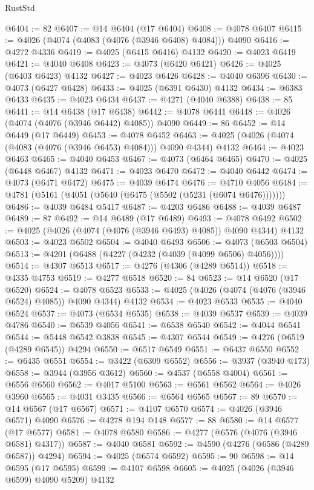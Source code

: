 \begin{lexlean}{RustStd}
\begin{coremodule}
@6404 := 82
@6407 := @14 @6404 (@17 @6404)
@6408 := @4078 @6407
@6415 := @4026 (@4074 (@4083 (@4076 (@3946 @6408) @4084))) @4090
@6416 := @4272 @4336
@6419 := @4025 (@6415 @6416) @4132
@6420 := @4023 @6419
@6421 := @4040 @6408
@6423 := @4073 (@6420 @6421)
@6426 := @4025 (@6403 @6423) @4132
@6427 := @4023 @6426
@6428 := @4040 @6396
@6430 := @4073 (@6427 @6428)
@6433 := @4025 (@6391 @6430) @4132
@6434 := @6383 @6433
@6435 := @4023 @6434
@6437 := @4271 (@4040 @6388)
@6438 := 85
@6441 := @14 @6438 (@17 @6438)
@6442 := @4078 @6441
@6448 := @4026 (@4074 (@4076 (@3946 @6442) @4085)) @4090
@6449 := 86
@6452 := @14 @6449 (@17 @6449)
@6453 := @4078 @6452
@6463 := @4025 (@4026 (@4074 (@4083 (@4076 (@3946 @6453) @4084))) @4090 @4344) @4132
@6464 := @4023 @6463
@6465 := @4040 @6453
@6467 := @4073 (@6464 @6465)
@6470 := @4025 (@6448 @6467) @4132
@6471 := @4023 @6470
@6472 := @4040 @6442
@6474 := @4073 (@6471 @6472)
@6475 := @4039 @6474
@6476 := @4710 @4056
@6484 := @4781 (@5161 (@4051 (@5640 (@6475 (@5502 (@5231 (@6074 @6476)))))))
@6486 := @4039 @6484 @5417
@6487 := @4203 @6486
@6488 := @4039 @6487
@6489 := 87
@6492 := @14 @6489 (@17 @6489)
@6493 := @4078 @6492
@6502 := @4025 (@4026 (@4074 (@4076 (@3946 @6493) @4085)) @4090 @4344) @4132
@6503 := @4023 @6502
@6504 := @4040 @6493
@6506 := @4073 (@6503 @6504)
@6513 := @4201 (@6488 (@4227 (@4232 (@4039 (@4099 @6506) @4056))))
@6514 := @4307 @6513
@6517 := @4276 (@4306 (@4289 @6514))
@6518 := @4335 @4753
@6519 := @4277 @6518
@6520 := 84
@6523 := @14 @6520 (@17 @6520)
@6524 := @4078 @6523
@6533 := @4025 (@4026 (@4074 (@4076 (@3946 @6524) @4085)) @4090 @4344) @4132
@6534 := @4023 @6533
@6535 := @4040 @6524
@6537 := @4073 (@6534 @6535)
@6538 := @4039 @6537
@6539 := @4039 @4786
@6540 := @6539 @4056
@6541 := @6538 @6540
@6542 := @4044 @6541
@6544 := @5448 @6542 @3838
@6545 := @4307 @6544
@6549 := @4276 (@6519 (@4289 @6545)) @4294
@6550 := @6517 @6549
@6551 := @6437 @6550
@6552 := @6435 @6551
@6554 := @3422 (@6309 @6552)
@6556 := @3937 (@3940 @173)
@6558 := @3944 (@3956 @3612)
@6560 := @4537 (@6558 @4004)
@6561 := @6556 @6560
@6562 := @4017 @5100
@6563 := @6561 @6562
@6564 := @4026 @3960
@6565 := @4031 @3435
@6566 := @6564 @6565
@6567 := 89
@6570 := @14 @6567 (@17 @6567)
@6571 := @4107 @6570
@6574 := @4026 (@3946 @6571) @4090
@6576 := @4278 @194 @148
@6577 := 88
@6580 := @14 @6577 (@17 @6577)
@6581 := @4078 @6580
@6586 := @4277 (@6576 (@4076 (@3946 @6581) @4317))
@6587 := @4040 @6581
@6592 := @4590 (@4276 (@6586 (@4289 @6587)) @4294)
@6594 := @4025 (@6574 @6592)
@6595 := 90
@6598 := @14 @6595 (@17 @6595)
@6599 := @4107 @6598
@6605 := @4025 (@4026 (@3946 @6599) @4090 @5209) @4132

\end{coremodule}
\end{lexlean}
